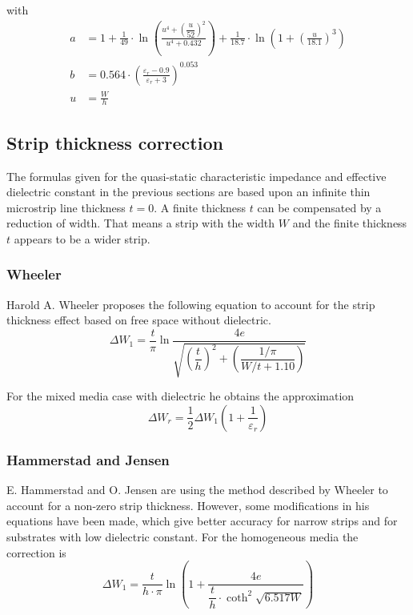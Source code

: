 \documentclass[10pt]{report}
\begin{document}
with
\begin{align}
a &= 1 + \frac{1}{49}\cdot\ln{\left(\frac{u^{4} + \left(\dfrac{u}{52}\right)^{2}}{u^{4} + 0.432}\right)} + \frac{1}{18.7}\cdot\ln{\left(1 + \left(\frac{u}{18.1}\right)^{3}\right)}\\
b &= 0.564\cdot\left(\frac{\varepsilon_{r} - 0.9}{\varepsilon_{r} + 3}\right)^{0.053}\\
u &= \frac{W}{h}
\end{align}

\subsection{Strip thickness correction}

The formulas given for the quasi-static characteristic impedance and
effective dielectric constant in the previous sections are based upon
an infinite thin microstrip line thickness $t = 0$.  A finite
thickness $t$ can be compensated by a reduction of width.  That means
a strip with the width $W$ and the finite thickness $t$ appears to be
a wider strip.

\subsubsection{Wheeler}

Harold A. Wheeler \cite{Wheeler} proposes the following equation to
account for the strip thickness effect based on free space without
dielectric.
\begin{equation}
\Delta W_1 = \dfrac{t}{\pi} \ln{\dfrac{4 e}{\sqrt{\left(\dfrac{t}{h}\right)^2 + \left(\dfrac{1/\pi}{W/t + 1.10}\right)}}}
\end{equation}

For the mixed media case with dielectric he obtains the approximation
\begin{equation}
\Delta W_r = \dfrac{1}{2} \Delta W_1 \left(1 + \dfrac{1}{\varepsilon_r}\right)
\end{equation}

\subsubsection{Hammerstad and Jensen}

E. Hammerstad and O. Jensen are using the method described by Wheeler
\cite{Wheeler} to account for a non-zero strip thickness.  However,
some modifications in his equations have been made, which give better
accuracy for narrow strips and for substrates with low dielectric
constant.  For the homogeneous media the correction is
\begin{equation}
\Delta W_1 = \dfrac{t}{h\cdot\pi} \ln{\left(1 + \dfrac{4e}{\dfrac{t}{h}\cdot \coth^2{\sqrt{6.517 W}}}\right)}
\end{equation}
\end{document}
